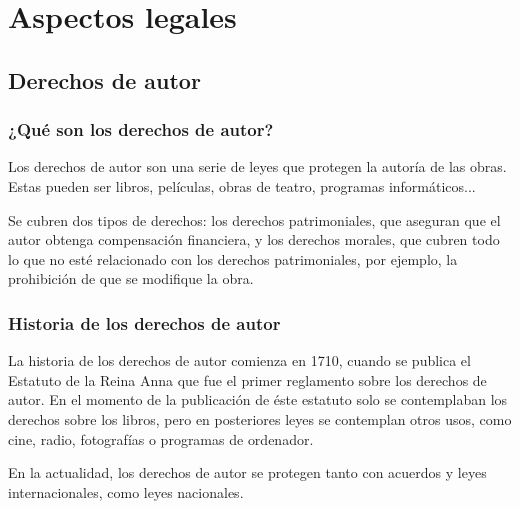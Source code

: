 
\chapter{Aspectos legales} %
\label{cha:AspectosLegales}

    \section{Derechos de autor} %
    \label{sec:DerechosDeAutor}
        \subsection{¿Qué son los derechos de autor?} %
        \label{sub:QueSonLosDerechosDeAutor}

            Los derechos de autor son una serie de leyes que protegen la autoría de las obras. Estas pueden ser libros,
            películas, obras de teatro, programas informáticos...\newline

            Se cubren dos tipos de derechos: los derechos patrimoniales, que aseguran que el autor obtenga compensación
            financiera, y los derechos morales, que cubren todo lo que no esté relacionado con los derechos
            patrimoniales, por ejemplo, la prohibición de que se modifique la obra.\cite{derechos_ompi}


        \subsection{Historia de los derechos de autor} %
        \label{sub:HistoriaDeLosDerechosDeAutor}

            La historia de los derechos de autor comienza en 1710, cuando se publica el Estatuto de la Reina
            Anna\cite{estatuto_anna} que fue el primer reglamento sobre los derechos de autor. En el momento de la
            publicación de éste estatuto solo se contemplaban los derechos sobre los libros, pero en posteriores leyes
            se contemplan otros usos, como cine, radio, fotografías o programas de ordenador.

            En la actualidad, los derechos de autor se protegen tanto con acuerdos y leyes internacionales, como leyes
            nacionales.

